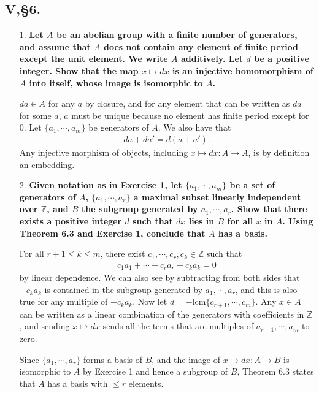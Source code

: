 \documentclass[12pt]{article}
\begin{document}
\subsection*{V,\S6.}
\begin{enumerate}
    \item[1.]
        \boldmath\textbf{Let $A$ be an abelian group with a finite number of generators, and assume that $A$ does not contain any element of finite period except the unit element. We write $A$ additively. Let $d$ be a positive integer. Show that the map $x \mapsto dx$ is an injective homomorphism of $A$ into itself, whose image is isomorphic to $A$.
        }\unboldmath \par
        $da \in A$ for any $a$ by closure, and for any element that can be written as $da$ for some $a$, $a$ must be unique because no element has finite period except for 0. Let $\{ a_1, \cdots, a_m \}$ be generators of $A$. %
        We also have that
        \begin{align*}
            da + da' = d(a + a').
        \end{align*}
        Any injective morphism of objects, including $x \mapsto dx : A \to A$, is by definition an embedding.

    \item[2.]
        \boldmath\textbf{Given notation as in Exercise 1, let $\{ a_1, \cdots, a_m \}$ be a set of generators of $A$, $\{ a_1, \cdots, a_r \}$ a maximal subset linearly independent over $\mathbb{Z}$, and $B$ the subgroup generated by $a_1, \cdots, a_r$. Show that there exists a positive integer $d$ such that $dx$ lies in $B$ for all $x$ in $A$. Using Theorem 6.3 and Exercise 1, conclude that $A$ has a basis.
        }\unboldmath \par
        For all $r + 1 \leq k \leq m$, there exist $c_1, \cdots, c_r, c_k \in \mathbb{Z}$ such that
        \begin{align*}
            c_1 a_1 + \cdots + c_r a_r + c_k a_k = 0
        \end{align*}
        by linear dependence. We can also see by subtracting from both sides that $-c_k a_k$ is contained in the subgroup generated by $a_1, \cdots, a_r$, and this is also true for any multiple of $-c_k a_k$. Now let $d = -\text{lcm}\{ c_{r + 1}, \cdots, c_m \}$. Any $x \in A$ can be written as a linear combination of the generators with coefficients in $\mathbb{Z}$, and sending $x \mapsto dx$ sends all the terms that are multiples of $a_{r + 1}, \cdots, a_m$ to zero. \par
        Since $\{ a_1, \cdots, a_r \}$ forms a basis of $B$, and the image of $x \mapsto dx : A \to B$ is isomorphic to $A$ by Exercise 1 and hence a subgroup of $B$, Theorem 6.3 states that $A$ has a basis with $\leq r$ elements.
\end{enumerate}
\end{document}
